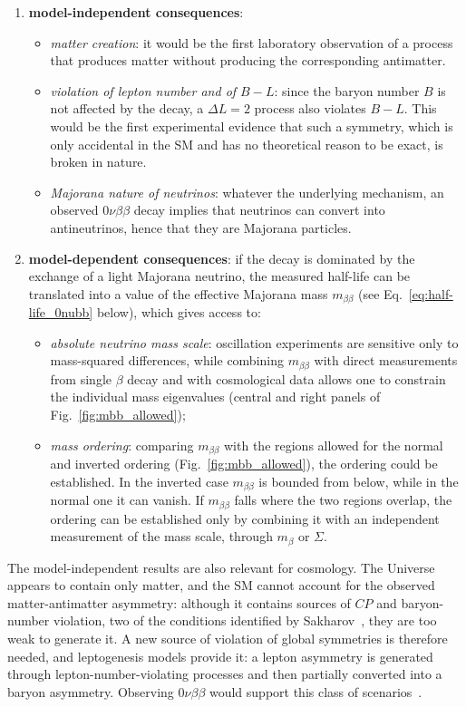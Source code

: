 \begin{enumerate}
\item \textbf{model-independent consequences}:
\begin{itemize}
    \item \textit{matter creation}: it would be the first laboratory observation of a process that produces matter without producing the corresponding antimatter.
    \item \textit{violation of lepton number and of $B-L$}: since the baryon number $B$ is not affected by the decay, a $\Delta L = 2$ process also violates $B-L$. This would be the first experimental evidence that such a symmetry, which is only accidental in the \ac{SM} and has no theoretical reason to be exact, is broken in nature.
    \item \textit{Majorana nature of neutrinos}: whatever the underlying mechanism, an observed $0\nu\beta\beta$ decay implies that neutrinos can convert into antineutrinos, hence that they are Majorana particles.
\end{itemize}

\item \textbf{model-dependent consequences}: if the decay is dominated by the exchange of a light Majorana neutrino, the measured half-life can be translated into a value of the effective Majorana mass $m_{\beta\beta}$ (see Eq.~\ref{eq:half-life_0nubb} below), which gives access to:
\begin{itemize}
    \item \textit{absolute neutrino mass scale}: oscillation experiments are sensitive only to mass-squared differences, while combining $m_{\beta\beta}$ with direct measurements from single $\beta$ decay and with cosmological data allows one to constrain the individual mass eigenvalues (central and right panels of Fig.~\ref{fig:mbb_allowed});
    \item \textit{mass ordering}: comparing $m_{\beta\beta}$ with the regions allowed for the normal and inverted ordering (Fig.~\ref{fig:mbb_allowed}), the ordering could be established. In the inverted case $m_{\beta\beta}$ is bounded from below, while in the normal one it can vanish. If $m_{\beta\beta}$ falls where the two regions overlap, the ordering can be established only by combining it with an independent measurement of the mass scale, through $m_\beta$ or $\Sigma$.
\end{itemize}
\end{enumerate} 

The model-independent results are also relevant for cosmology. The Universe appears to contain only matter, and the \ac{SM} cannot account for the observed matter-antimatter asymmetry: although it contains sources of $CP$ and baryon-number violation, two of the conditions identified by Sakharov~\cite{sakharov}, they are too weak to generate it. A new source of violation of global symmetries is therefore needed, and leptogenesis models provide it: a lepton asymmetry is generated through lepton-number-violating processes and then partially converted into a baryon asymmetry. Observing $0\nu\beta\beta$ would support this class of scenarios~\cite{morella}.


